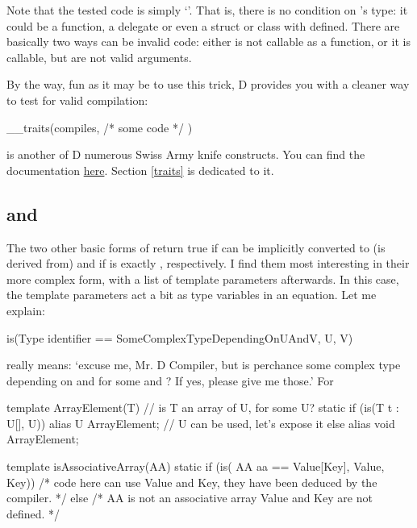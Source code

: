 Note that the tested code is simply `'. That is, there is no condition on 's type: it could be a function, a delegate or even a struct or class with  defined. There are basically two ways  can be invalid code: either  is not callable as a function, or it is callable, but  are not valid arguments.

By the way, fun as it may be to use this trick, D provides you with a cleaner way to test for valid compilation:

\begin{dcode}
__traits(compiles, { /* some code */ })
\end{dcode}

 is another of D numerous Swiss Army knife constructs. You can find the  documentation \href{http://www.dlang.org/traits.html#compiles}{here}. Section \ref{traits} is dedicated to it.

\subsection{
\texorpdfstring{ and }
               {is(Type : AnotherType) and is(Type == AnotherType)}}
\label{istypeanothertype}

The two other basic forms of  return true if  can be implicitly converted to (is derived from)  and if  is exactly , respectively.  I find them most interesting in their more complex form, with a list of template parameters afterwards. In this case, the template parameters act a bit as type variables in an equation. Let me explain:

\begin{dcode}
is(Type identifier == SomeComplexTypeDependingOnUAndV, U, V)
\end{dcode}

really means: `excuse me, Mr. D Compiler, but is  perchance some complex type depending on  and  for some  and ? If yes, please give me those.'
For 

\begin{dcode}
template ArrayElement(T)
{
    // is T an array of U, for some U?
    static if (is(T t : U[], U)) 
        alias U ArrayElement; // U can be used, let's expose it
    else
        alias void ArrayElement;
}

template isAssociativeArray(AA)
{
    static if (is( AA aa == Value[Key], Value, Key))  
        /* code here can use Value and Key, 
           they have been deduced by the compiler. */ 
    else
        /* AA is not an associative array
          Value and Key are not defined. */
}
\end{dcode}

